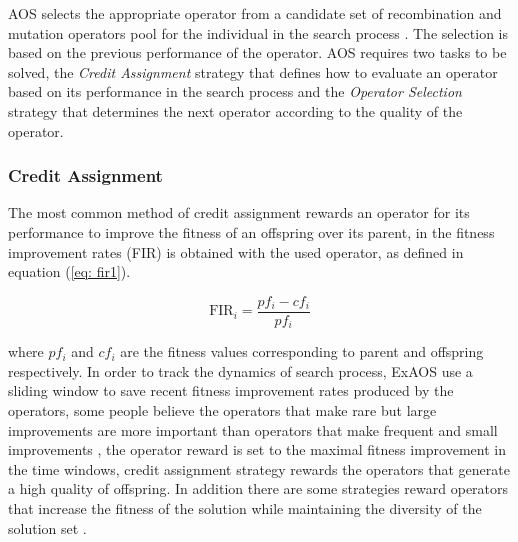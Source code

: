 \documentclass[journal]{IEEEtran}
\begin{document}
AOS selects the appropriate operator from a candidate set of recombination and mutation operators pool for the individual in the search process \cite{hitomi2016classification}. The selection is based on the previous performance of the operator.
AOS requires two tasks to be solved, the \textit{Credit Assignment} strategy that defines how to evaluate an operator based on its performance in the search process and the \textit{Operator Selection} strategy that determines the next operator according to the quality of the operator.

\subsubsection{Credit Assignment}
The most common method of credit assignment rewards an operator for its performance to improve the fitness of an offspring over its parent, in \cite{lin2016adaptive} the fitness improvement rates (FIR) is obtained with the used operator, as defined in equation (\ref{eq: fir1}).

\begin{equation}
  \text{FIR}_{i}=\frac{pf_{i}-cf_{i}}{pf_{i}} \label{eq: fir1}
\end{equation}

where $pf_i$ and $cf_i$ are the fitness values corresponding to parent and offspring respectively.
In order to track the dynamics of search process, ExAOS \cite{fialho2008extreme} use a sliding window to save recent fitness improvement rates produced by the operators,
some people believe the operators that make rare but large improvements are more important than operators that make frequent and small improvements \cite{fialho2009dynamic},
the operator reward is set to the maximal fitness improvement in the time windows, credit assignment strategy rewards the operators that generate a high quality of offspring.
In addition there are some strategies reward operators that increase the fitness of the solution while maintaining the diversity of the solution set \cite{auer2002finite}.
\end{document}
